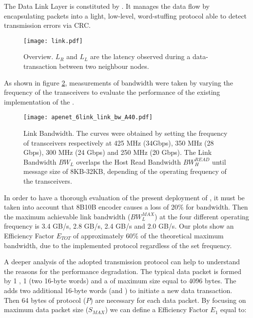 The Data Link Layer is constituted by . It manages the
data flow by encapsulating packets into a light, low-level,
word-stuffing protocol able to detect transmission errors via CRC.

\begin{figure}[!hbt]
  \centering
  \texttt{[image: link.pdf]}
  \caption{ Overview. $L_{R}$ and $L_{L}$ are the
  latency observed during a data-transaction between two neighbour
  nodes.}
  \label{fig:link}
\end{figure}


As shown in figure \ref{fig:link_bw}, measurements of bandwidth were
taken by varying the frequency of the transceivers to evaluate the
performance of the existing implementation of the .
 
\begin{figure}[!hbt]
  \centering
  \texttt{[image: apenet\_6link\_link\_bw\_A40.pdf]}
  \caption{\apenetp Link Bandwidth. The curves were obtained by
    setting the frequency of transceivers respectively at 425 MHz
    (34Gbps), 350 MHz (28 Gbps), 300 MHz (24 Gbps) and 250 MHz (20
    Gbps). The Link Bandwidth $BW_{L}$ overlaps the Host Read
    Bandwidth $BW_{H}^{READ}$ until message size of 8KB-32KB,
    depending of the operating frequency of the transceivers.}
  \label{fig:link_bw}
\end{figure}


In order to have a thorough evaluation of the present deployment of
, it must be taken into account that 8B10B encoder
causes a loss of 20\% for bandwidth. Then the maximum achievable link
bandwidth ($BW_{L}^{MAX}$) at the four different operating frequency
is 3.4 GB/s, 2.8 GB/s, 2.4 GB/s and 2.0 GB/s.
Our plots show an Efficiency Factor $E_{TOT}$ of approximately 60\% of
the theoretical maximum bandwidth, due to the implemented protocol
regardless of the set frequency.


A deeper analysis of the adopted transmission protocol can help to
understand the reasons for the performance degradation. The typical
\apenetp data packet is formed by 1 \header, 1 \footer (two 16-byte
words) and a \payload of maximum size equal to 4096 bytes.
The  adds two additional 16-byte words (\magic and
\start) to initiate a new data transaction. Then 64 bytes of protocol
($P$) are necessary for each data packet. By focusing on maximum data
packet size ($S_{MAX}$) we can define a Efficiency Factor $E_{1}$
equal to:

